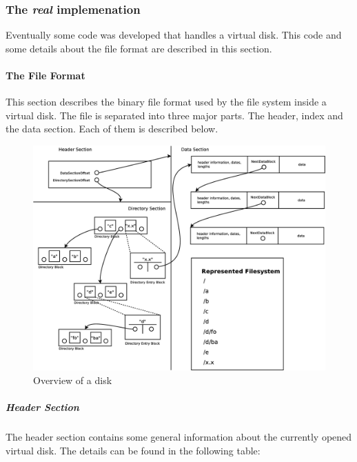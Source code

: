 \subsubsection{The \emph{real} implemenation}

Eventually some code was developed  that handles a virtual disk. This code and
some details about the file format are described in this section.

\paragraph{The File Format}
This section describes the binary file format used by the file system inside a
virtual disk. The file is separated into three major parts. The header, index
and the data section. Each of them is described below.

\begin{figure}[h!]
\centering
\includegraphics[width=1\textwidth]{figures/fileFormat.eps}
\caption{Overview of a disk}
\label{fig:disk_overview}
\end{figure}

\subparagraph{Header Section} The header section contains some general information
about the currently opened virtual disk. The details can be found in the
following table:

